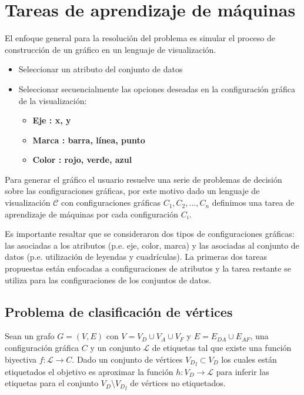\section{Tareas de aprendizaje de m\'aquinas}

El enfoque general para la resoluci\'on del problema es simular el proceso de
construcci\'on de un gr\'afico en un lenguaje de visualizaci\'on.

\begin{itemize}
    \item Seleccionar un atributo del conjunto de datos
    \item Seleccionar secuencialmente las opciones deseadas en la configuraci\'on gr\'afica de la visualizaci\'on: \begin{itemize}
        \item \bf Eje : x, y
        \item \bf Marca : barra, l\'inea, punto
        \item \bf Color : rojo, verde, azul
    \end{itemize}
\end{itemize}

Para generar el gr\'afico el usuario resuelve una serie de problemas de decisi\'on sobre las configuraciones gr\'aficas,
por este motivo dado un lenguaje de visualizaci\'on $\mathcal{C}$ con configuraciones gr\'aficas $C_1, C_2, ..., C_n$
definimos una tarea de aprendizaje de m\'aquinas por cada configuraci\'on $C_i$.

Es importante resaltar que se consideraron dos tipos de configuraciones gr\'aficas: las asociadas
a los atributos (p.e. eje, color, marca) y las asociadas al conjunto de datos (p.e. utilizaci\'on de leyendas y cuadr\'iculas).
La primeras dos tareas propuestas est\'an enfocadas a configuraciones de atributos y la tarea restante se utiliza para
las configuraciones de los conjuntos de datos.

\subsection{Problema de clasificaci\'on de v\'ertices}

Sean un grafo $G = (V,E)$ con $V = V_D \cup V_A \cup V_F$ y $E = E_{DA} \cup E_{AF}$, una configuraci\'on
gr\'afica $C$ y un conjunto $\mathcal{L}$ de etiquetas tal que existe una funci\'on biyectiva $f : \mathcal{L} \to C$.
Dado un conjunto de v\'ertices ${V_D}_l \subset V_D $ los cuales est\'an etiquetados el objetivo es aproximar la funci\'on
$h : V_D \to \mathcal{L}$ para inferir las
etiquetas para el conjunto $V_D \setminus {V_D}_l$ de v\'ertices no etiquetados. 

